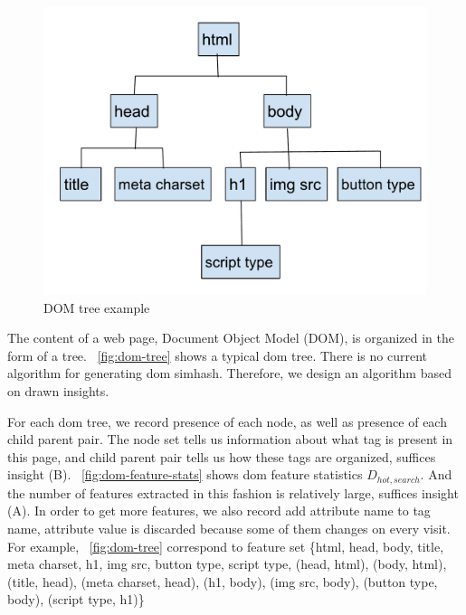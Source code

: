 \begin{figure}[t]
  \centering
  \includegraphics[width=.5\textwidth]{fig/dom-tree}
  \caption{DOM tree example}
  \label{fig:dom-tree}
\end{figure}

The content of a web page, Document Object Model (DOM), is organized in the form of a tree.
~\autoref{fig:dom-tree} shows a typical dom tree.
There is no current algorithm for generating dom simhash. Therefore, we design
an algorithm based on drawn insights.

For each dom tree, we record presence of each node, as
well as presence of each child parent pair. The node set tells us information about what
tag is present in this page, and child parent pair tells us how these tags are
organized, suffices insight (B). ~\autoref{fig:dom-feature-stats} shows dom
feature statistics $D_{hot, search}$. And the number of features extracted in this
fashion is relatively large, suffices insight (A). In order to get more
features, we also record add attribute name to tag name, attribute value is
discarded because some of them changes on every visit. For example,
~\autoref{fig:dom-tree} correspond to feature set \{html, head, body, title,
  meta charset, h1, img src, button type, script type, (head, html), (body,
  html), (title, head), (meta charset, head), (h1, body), (img src, body),
(button type, body), (script type, h1)\}

